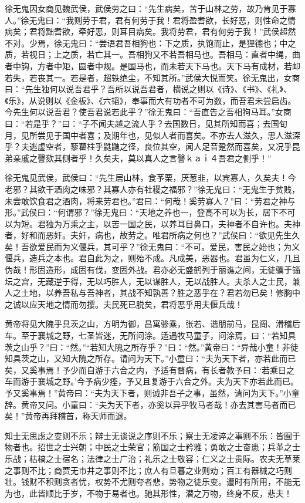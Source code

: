 \documentclass[12pt,UTF8]{ctexbook}
\begin{document}
徐无鬼因女商见魏武侯，武侯劳之曰：“先生病矣，苦于山林之劳，故乃肯见于寡人。”徐无鬼曰：“我则劳于君，君有何劳于我！君将盈耆欲，长好恶，则性命之情病矣；君将黜耆欲，牵好恶，则耳目病矣。我将劳君，君有何劳于我！”武侯超然不对。少焉，徐无鬼曰：“尝语君吾相狗也：下之质，执饱而止，是狸德也；中之质，若视日；上之质，若亡其一。吾相狗又不若吾相马也。吾相马：直者中绳，曲者中钩，方者中矩，圆者中规。是国马也，而未若天下马也。天下马有成材，若卹若失，若丧其一。若是者，超轶绝尘，不知其所。”武侯大悦而笑。徐无鬼出，女商曰：“先生独何以说吾君乎？吾所以说吾君者，横说之则以《诗》、《书》、《礼》、《乐》，从说则以《金板》、《六韬》，奉事而大有功者不可为数，而吾君未尝启齿。今先生何以说吾君？使吾君说若此乎？”徐无鬼曰：“吾直告之吾相狗马耳。”女商曰：“若是乎？”曰：“子不闻夫越之流人乎？去国数日，见其所知而喜；去国旬月，见所尝见于国中者喜；及期年也，见似人者而喜矣。不亦去人滋久，思人滋深乎？夫逃虚空者，藜藋柱乎鼪鼬之径，良位其空，闻人足音跫然而喜矣，又况乎昆弟亲戚之謦欬其侧者乎！久矣夫，莫以真人之言謦ｋａｉ４吾君之侧乎！”

徐无鬼见武侯，武侯曰：“先生居山林，食芧栗，厌葱韭，以宾寡人，久矣夫！今老邪？其欲干酒肉之味邪？其寡人亦有社稷之福邪？”徐无鬼曰：“无鬼生于贫贱，未尝敢饮食君之酒肉，将来劳君也。”君曰：“何哉！奚劳寡人？”曰：“劳君之神与形。”武侯曰：“何谓邪？”徐无鬼曰：“天地之养也一，登高不可以为长，居下不可以为短。君独为万乘之主，以苦一国之民，以养耳目鼻口，夫神者不自许也。夫神者，好和而恶奸。夫奸，病也，故劳之。唯君所病之何也？”武侯曰：“欲见先生久矣！吾欲爱民而为义偃兵，其可乎？”徐无鬼曰：“不可。爱民，害民之始也；为义偃兵，造兵之本也。君自此为之，则殆不成。凡成美，恶器也。君虽为仁义，几且伪哉！形固造形，成固有伐，变固外战。君亦必无盛鹤列于丽谯之间，无徒骥于锱坛之宫，无藏逆于得，无以巧胜人，无以谋胜人，无以战胜人。夫杀人之士民，兼人之土地，以养吾私与吾神者，其战不知孰善？胜之恶乎在？君若勿已矣！修胸中之诚以应天地之情而勿撄。夫民死已脱矣，君将恶乎用夫偃兵哉！

黄帝将见大隗乎具茨之山，方明为御，昌寓骖乘，张若、谐朋前马，昆阍、滑稽后车。至于襄城之野，七圣皆迷，无所问涂。适遇牧马童子，问涂焉，曰：“若知具茨之山乎？”曰：“然。”“若知大隗之所存乎？”曰：“然。”黄帝曰：“异哉小童！非徒知具茨之山，又知大隗之所存。请问为天下。”小童曰：“夫为天下者，亦若此而已矣，又奚事焉！予少而自游于六合之内，予适有瞀病，有长者教予曰：‘若乘日之车而游于襄城之野。’今予病少痊，予又且复游于六合之外。夫为天下亦若此而已。予又奚事焉！”黄帝曰：“夫为天下者，则诚非吾子之事，虽然，请问为天下。”小童辞。黄帝又问。小童曰：“夫为天下者，亦奚以异乎牧马者哉！亦去其害马者而已矣！”黄帝再拜稽首，称天师而退。

知士无思虑之变则不乐；辩士无谈说之序则不乐；察士无凌谇之事则不乐：皆囿于物者也。招世之士兴朝；中民之士荣官；筋国之士矜雅；勇敢之士奋患；兵革之士乐战；枯槁之士宿名；法律之士广治；礼乐之士敬容；仁义之士贵际。农夫无草莱之事则不比；商贾无市井之事则不比；庶人有旦暮之业则劝；百工有器械之巧则壮。钱财不积则贪者忧，权势不尤则夸者悲，势物之徒乐变。遭时有所用，不能无为也，此皆顺比于岁，不物于易者也。驰其形性，潜之万物，终身不反，悲夫！
\end{document}
